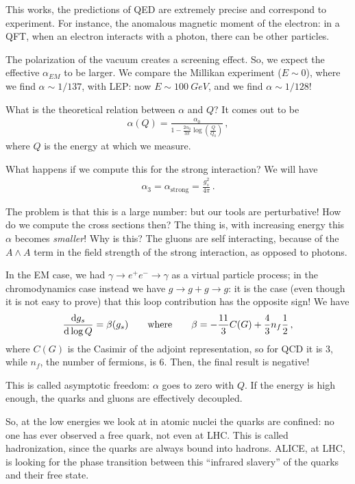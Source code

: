 \documentclass[main.tex]{subfiles}
\begin{document}
This works, the predictions of QED are extremely precise and correspond to experiment.
For instance, the anomalous magnetic moment of the electron: in a QFT, when an electron interacts with a photon, there can be other particles. 

The polarization of the vacuum creates a screening effect. 
So, we expect the effective \(\alpha_{EM}\) to be larger. 
We compare the Millikan experiment (\(E \sim 0\)), where we find \(\alpha \sim 1/137\), with LEP: now \(E \sim \SI{100}{GeV}\), and we find \(\alpha \sim 1/128\)!

What is the theoretical relation between \(\alpha \) and \(Q\)? It comes out to be 
%
\begin{align}
\alpha (Q) = \frac{\alpha_0 }{1 - \frac{2 \alpha_0 }{3 \pi } \log(\frac{Q}{Q_0 })}
\,,
\end{align}
%
where \(Q\) is the energy at which we measure. 

What happens if we compute this for the strong interaction? We will have 
%
\begin{align}
\alpha_3 = \alpha _{\text{strong}} = \frac{g^2_{s}}{4 \pi }
\,.
\end{align}

The problem is that this is a large number: but our tools are perturbative! How do we compute the cross sections then? 
The thing is, with increasing energy this \(\alpha \) becomes \emph{smaller}! 
Why is this? The gluons are self interacting, because of the \(A \wedge A\) term in the field strength of the strong interaction, as opposed to photons. 

In the EM case, we had \(\gamma \to e^{+} e^{-} \to \gamma \) as a virtual particle process; in the chromodynamics case instead we have \(g \to g + g \to g \): it is the case (even though it is not easy to prove) that this loop contribution has the opposite sign! We have 
%
\begin{align}
\dv{g_{s}}{\log Q} = \beta (g_s) 
\qquad \text{where} \qquad
\beta = - \frac{11}{3} C(G) +  \frac{4}{3} n_f \frac{1}{2}  
\,,
\end{align}
%
where \(C(G)\) is the Casimir of the adjoint representation, so for QCD it is 3, while \(n_f\), the number of fermions, is 6. Then, the final result is negative! 

This is called asymptotic freedom: \(\alpha \) goes to zero with \(Q\). 
If the energy is high enough, the quarks and gluons are effectively decoupled. 

So, at the low energies we look at in atomic nuclei the quarks are confined: no one has ever observed a free quark, not even at LHC. 
This is called hadronization, since the quarks are always bound into hadrons. ALICE, at LHC, is looking for the phase transition between this ``infrared slavery'' of the quarks and their free state. 
\end{document}

